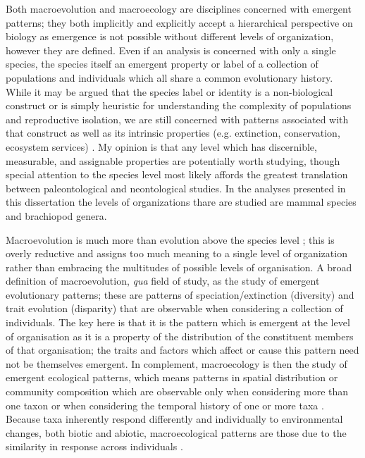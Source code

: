 Both macroevolution and macroecology are disciplines concerned with emergent patterns; they both implicitly and explicitly accept a hierarchical perspective on biology as emergence is not possible without different levels of organization, however they are defined. Even if an analysis is concerned with only a single species, the species itself an emergent property or label of a collection of populations and individuals which all share a common evolutionary history. While it may be argued that the species label or identity is a non-biological construct or is simply heuristic for understanding the complexity of populations and reproductive isolation, we are still concerned with patterns associated with that construct as well as its intrinsic properties (e.g. extinction, conservation, ecosystem services) \citep{Coyne2004,Jablonski2008a}. My opinion is that any level which has discernible, measurable, and assignable properties are potentially worth studying, though special attention to the species level most likely affords the greatest translation between paleontological and neontological studies. In the analyses presented in this dissertation the levels of organizations thare are studied are mammal species and brachiopod genera.

Macroevolution is much more than evolution above the species level \citep{Foote2007b}; this is overly reductive and assigns too much meaning to a single level of organization rather than embracing the multitudes of possible levels of organisation. A broad definition of macroevolution, \textit{qua} field of study, as the study of emergent evolutionary patterns; these are patterns of speciation/extinction (diversity) and trait evolution (disparity) that are observable when considering a collection of individuals. The key here is that it is the pattern which is emergent at the level of organisation as it is a property of the distribution of the constituent members of that organisation; the traits and factors which affect or cause this pattern need not be themselves emergent. In complement, macroecology is then the study of emergent ecological patterns, which means patterns in spatial distribution or community composition which are observable only when considering more than one taxon or when considering the temporal history of one or more taxa \citep{Brown1989,Brown1995,Smith2008b}. Because taxa inherently respond differently and individually to environmental changes, both biotic and abiotic, macroecological patterns are those due to the similarity in response across individuals \citep{Blois2009}.

